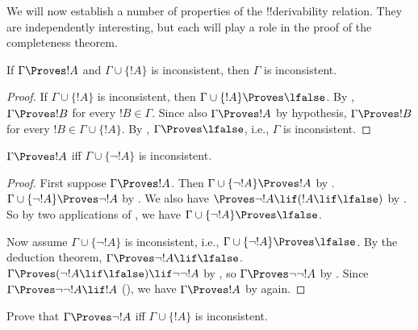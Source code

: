 \documentclass[../../../include/open-logic-section]{subfiles}
\begin{document}
      {}
      {}


We will now establish a number of properties of the !!{derivability}
relation.  They are independently interesting, but each will play a
role in the proof of the completeness theorem.

\begin{prop}
  If $\Gamma \Proves !A$ and $\Gamma \cup \{!A\}$ is inconsistent,
  then $\Gamma$ is inconsistent.
\end{prop}

\begin{proof}
  If $\Gamma \cup \{!A\}$ is inconsistent, then $\Gamma \cup \{!A\}
  \Proves \lfalse$. By , $\Gamma \Proves
  !B$ for every $!B \in \Gamma$. Since also $\Gamma \Proves !A$ by
  hypothesis, $\Gamma \Proves !B$ for every $!B \in \Gamma \cup
  \{!A\}$. By , $\Gamma \Proves
  \lfalse$, i.e., $\Gamma$ is inconsistent.
\end{proof}

\begin{prop}
$\Gamma \Proves !A$ iff $\Gamma \cup \{\lnot !A\}$ is inconsistent.
\end{prop}

\begin{proof}
First suppose $\Gamma \Proves !A$. Then $\Gamma \cup \{\lnot !A\}
\Proves !A$ by . $\Gamma \cup \{\lnot
!A\} \Proves \lnot !A$ by .  We also have
$\Proves \lnot !A \lif (!A \lif \lfalse)$ by . So
by two applications of , we have $\Gamma \cup \{\lnot
!A\} \Proves \lfalse$.

Now assume $\Gamma \cup \{\lnot !A\}$ is inconsistent, i.e., $\Gamma
\cup \{\lnot !A\} \Proves \lfalse$. By the deduction theorem, $\Gamma
\Proves \lnot !A \lif \lfalse$. $\Gamma \Proves (\lnot !A \lif
\lfalse) \lif \lnot\lnot !A$ by , so $\Gamma
\Proves \lnot\lnot !A$ by . Since $\Gamma \Proves
\lnot\lnot !A \lif !A$ (), we have $\Gamma
\Proves !A$ by  again.
\end{proof}

\begin{prob}
Prove that $\Gamma \Proves \lnot !A$ iff $\Gamma \cup \{!A\}$ is
inconsistent.
\end{prob}
\end{document}

